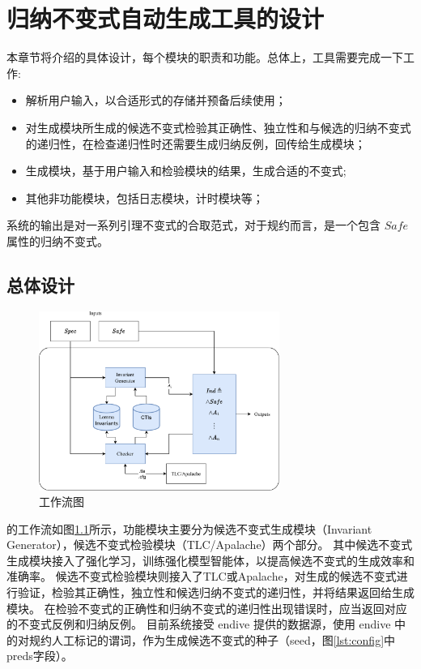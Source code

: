 \chapter{归纳不变式自动生成工具的设计}\label{chap:design}

本章节将介绍\rltla 的具体设计，每个模块的职责和功能。总体上，工具需要完成一下工作:
\begin{itemize}
    \item 解析用户输入，以合适形式的存储并预备后续使用；
    \item 对生成模块所生成的候选不变式检验其正确性、独立性和与候选的归纳不变式的递归性，在检查递归性时还需要生成归纳反例，回传给生成模块；
    \item 生成模块，基于用户输入和检验模块的结果，生成合适的不变式;
    \item 其他非功能模块，包括日志模块，计时模块等；
\end{itemize}
系统的输出是对一系列引理不变式的合取范式，对于规约而言，是一个包含 $Safe$ 属性的归纳不变式。

\section{总体设计}
\begin{figure}[h]
    \centering
    \includegraphics[width=0.7\textwidth]{figures/workflow.pdf}
    \caption{\rltla 工作流图}
    \label{fig:rltla}
\end{figure}

\rltla 的工作流如图\ref{fig:rltla}所示，功能模块主要分为候选不变式生成模块（Invariant Generator），候选不变式检验模块（TLC/Apalache）两个部分。
其中候选不变式生成模块接入了强化学习，训练强化模型智能体，以提高候选不变式的生成效率和准确率。
候选不变式检验模块则接入了TLC或Apalache，对生成的候选不变式进行验证，检验其正确性，独立性和候选归纳不变式的递归性，并将结果返回给生成模块。
在检验不变式的正确性和归纳不变式的递归性出现错误时，应当返回对应的不变式反例和归纳反例。
目前系统接受 endive 提供的数据源，使用 endive 中的对规约人工标记的谓词，作为生成候选不变式的种子（seed，图\ref{lst:config}中preds字段）。


